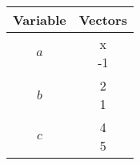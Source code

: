 \begin{tabular}[12pt]{ |c| c|}
    \hline
    \textbf{Variable} & \textbf{Vectors}\\ 
    \hline
    $a$ & \myvec{x\\-1} \\
    \hline 
    $b$ & \myvec{2\\1}\\
    \hline   
    $c$ & \myvec{4\\5}\\
    \hline  
    \end{tabular}